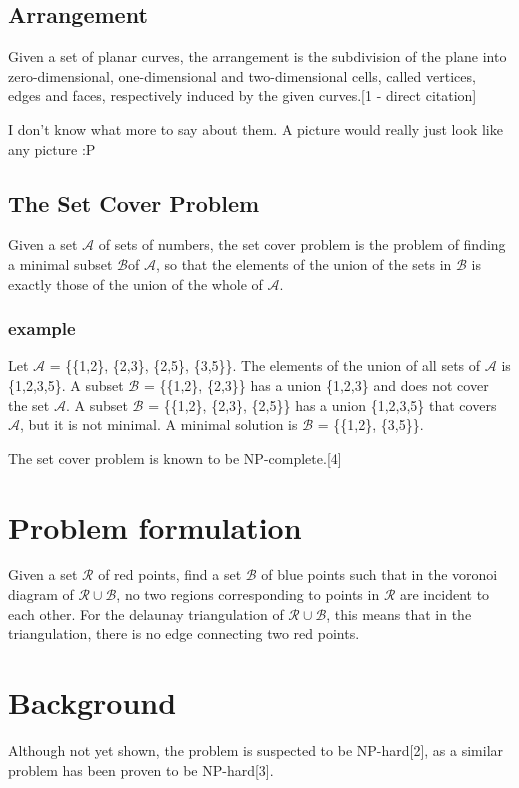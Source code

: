 \documentclass[a4paper,12pt]{article}
\begin{document}
\subsection{Arrangement}
Given a set of planar curves, the arrangement is the subdivision of the plane into zero-dimensional, one-dimensional and two-dimensional cells, called vertices, edges and faces, respectively induced by the given curves.[1 - direct citation]

I don't know what more to say about them. A picture would really just look like any picture :P

\subsection{The Set Cover Problem}
Given a set $\mathcal A$ of sets of numbers, the set cover problem is the problem of finding a minimal subset $\mathcal B$of $\mathcal A$, so that the elements of the union of the sets in $\mathcal B$ is exactly those of the union of the whole of $\mathcal A$.

\subsubsection{example}
Let $\mathcal A$ =  \{\{1,2\}, \{2,3\}, \{2,5\}, \{3,5\}\}. The elements of the union of all sets of $\mathcal A$ is \{1,2,3,5\}. A subset $\mathcal B$ = \{\{1,2\}, \{2,3\}\} has a union \{1,2,3\} and does not cover the set $\mathcal A$. A subset $\mathcal B$ = \{\{1,2\}, \{2,3\}, \{2,5\}\} has a union \{1,2,3,5\} that covers $\mathcal A$, but it is not minimal. A minimal solution is $\mathcal B$ = \{\{1,2\}, \{3,5\}\}.

The set cover problem is known to be NP-complete.[4]
\section{Problem formulation}
Given a set $\mathcal{R}$ of red points, find a set $\mathcal{B}$ of blue points such that in the voronoi diagram of $\mathcal{R} \cup \mathcal{B}$, no two regions corresponding to points in $\mathcal{R}$ are incident to each other. For the delaunay triangulation of $\mathcal{R} \cup \mathcal{B}$, this means that in the triangulation, there is no edge connecting two red points.


\section{Background}
Although not yet shown, the problem is suspected to be NP-hard[2], as a similar problem has been proven to be NP-hard[3].
\end{document}
